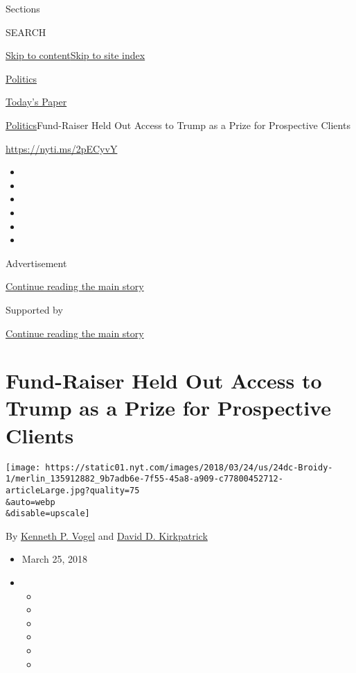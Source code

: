 Sections

SEARCH

\protect\hyperlink{site-content}{Skip to
content}\protect\hyperlink{site-index}{Skip to site index}

\href{https://www.nytimes.com/section/politics}{Politics}

\href{https://myaccount.nytimes.com/auth/login?response_type=cookie\&client_id=vi}{}

\href{https://www.nytimes.com/section/todayspaper}{Today's Paper}

\href{/section/politics}{Politics}\textbar{}Fund-Raiser Held Out Access
to Trump as a Prize for Prospective Clients

\url{https://nyti.ms/2pECyvY}

\begin{itemize}
\item
\item
\item
\item
\item
\item
\end{itemize}

Advertisement

\protect\hyperlink{after-top}{Continue reading the main story}

Supported by

\protect\hyperlink{after-sponsor}{Continue reading the main story}

\hypertarget{fund-raiser-held-out-access-to-trump-as-a-prize-for-prospective-clients}{%
\section{Fund-Raiser Held Out Access to Trump as a Prize for Prospective
Clients}\label{fund-raiser-held-out-access-to-trump-as-a-prize-for-prospective-clients}}

\texttt{[image: https://static01.nyt.com/images/2018/03/24/us/24dc-Broidy-1/merlin\_135912882\_9b7adb6e-7f55-45a8-a909-c77800452712-articleLarge.jpg?quality=75\\\&auto=webp\\\&disable=upscale]}

By \href{https://www.nytimes.com/by/kenneth-p-vogel}{Kenneth P. Vogel}
and \href{https://www.nytimes.com/by/david-d-kirkpatrick}{David D.
Kirkpatrick}

\begin{itemize}
\item
  March 25, 2018
\item
  \begin{itemize}
  \item
  \item
  \item
  \item
  \item
  \item
  \end{itemize}
\end{itemize}

